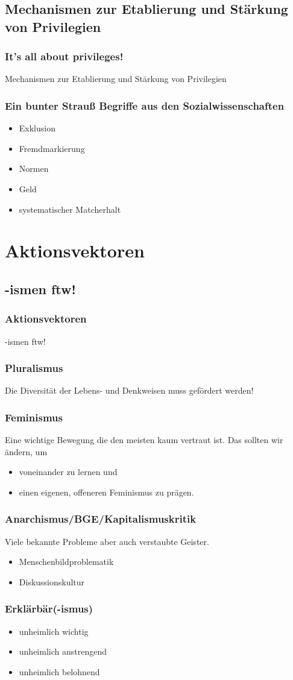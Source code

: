 \documentclass{beamer}
\begin{document}
\subsection{Mechanismen zur Etablierung und Stärkung von Privilegien}

\frame
{
  \frametitle{It's all about privileges!}
  Mechanismen zur Etablierung und Stärkung von Privilegien
}
\frame
{
  \frametitle{Ein bunter Strauß Begriffe aus den Sozialwissenschaften}
  
  \begin{itemize}[<+->]
  \item Exklusion
  \item Fremdmarkierung
  \item Normen
  \item Geld
  \item systematischer Matcherhalt
  \end{itemize}
}
\section{Aktionsvektoren}
\subsection{-ismen ftw!}

\frame
{
  \frametitle{Aktionsvektoren}
  -ismen ftw!
}
\frame
{
  \frametitle{Pluralismus}
  
  Die Diversität der Lebens- und Denkweisen muss gefördert werden!
}
\frame
{
  \frametitle{Feminismus}
  
  Eine wichtige Bewegung die den meisten kaum vertraut ist. Das sollten wir ändern, um
  \begin{itemize}[<+->]
  \item voneinander zu lernen und
  \item einen eigenen, offeneren Feminismus zu prägen.
  \end{itemize}

}
\frame
{
  \frametitle{Anarchismus/BGE/Kapitalismuskritik}
  
  Viele bekannte Probleme aber auch verstaubte Geister.
  \begin{itemize}[<+->]
  \item Menschenbildproblematik
  \item Diskussionskultur
  \end{itemize}

}
\frame
{
  \frametitle{Erklärbär(-ismus)}
  
  \begin{itemize}[<+->]
  \item unheimlich wichtig
  \item unheimlich anstrengend
  \item unheimlich belohnend
  \end{itemize}
  
}
\end{document}
